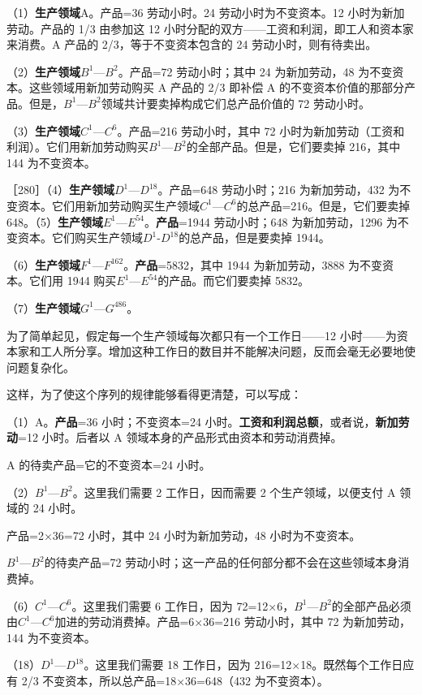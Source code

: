 （1）\textbf{生产领域}A。产品=36 劳动小时。24 劳动小时为不变资本。12 小时为新加劳动。产品的 1/3 由参加这 12 小时分配的双方——工资和利润，即工人和资本家来消费。A 产品的 2/3，等于不变资本包含的 24 劳动小时，则有待卖出。

（2）\textbf{生产领域}$B^{1}$—$B^{2}$。产品=72 劳动小时；其中 24 为新加劳动，48 为不变资本。这些领域用新加劳动购买 A 产品的 2/3 即补偿 A 的不变资本价值的那部分产品。但是，$B^{1}$—$B^{2}$领域共计要卖掉构成它们总产品价值的 72 劳动小时。

（3）\textbf{生产领域}$C^{1}$—$C^{6}$。产品=216 劳动小时，其中 72 小时为新加劳动（工资和利润）。它们用新加劳动购买$B^{1}$—$B^{2}$的全部产品。但是，它们要卖掉 216，其中 144 为不变资本。

［280］（4）\textbf{生产领域}$D^{1}$—$D^{18}$。产品=648 劳动小时；216 为新加劳动，432 为不变资本。它们用新加劳动购买生产领域$C^{1}$—$C^{6}$的总产品=216。但是，它们要卖掉 648。（5）\textbf{生产领域}$E^{1}$—$E^{54}$。\textbf{产品}=1944 劳动小时；648 为新加劳动，1296 为不变资本。它们购买生产领域$D^{1}$-$D^{18}$的总产品，但是要卖掉 1944。

（6）\textbf{生产领域}$F^{1}$—$F^{162}$。\textbf{产品}=5832，其中 1944 为新加劳动，3888 为不变资本。它们用 1944 购买$E^{1}$—$E^{54}$的产品。而它们要卖掉 5832。

（7）\textbf{生产领域}$G^{1}$—$G^{486}$。

为了简单起见，假定每一个生产领域每次都只有一个工作日——12 小时——为资本家和工人所分享。增加这种工作日的数目并不能解决问题，反而会毫无必要地使问题复杂化。

这样，为了使这个序列的规律能够看得更清楚，可以写成：

（1）A。\textbf{产品}=36 小时；不变资本=24 小时。\textbf{工资和利润总额}，或者说，\textbf{新加劳动}=12 小时。后者以 A 领域本身的产品形式由资本和劳动消费掉。

A 的待卖产品=它的不变资本=24 小时。

（2）$B^{1}$—$B^{2}$。这里我们需要 2 工作日，因而需要 2 个生产领域，以便支付 A 领域的 24 小时。

产品=2×36=72 小时，其中 24 小时为新加劳动，48 小时为不变资本。

$B^{1}$—$B^{2}$的待卖产品=72 劳动小时；这一产品的任何部分都不会在这些领域本身消费掉。

（6）$C^{1}$—$C^{6}$。这里我们需要 6 工作日，因为 72=12×6，$B^{1}$—$B^{2}$的全部产品必须由$C^{1}$—$C^{6}$加进的劳动消费掉。产品=6×36=216 劳动小时，其中 72 为新加劳动，144 为不变资本。

（18）$D^{1}$—$D^{18}$。这里我们需要 18 工作日，因为 216=12×18。既然每个工作日应有 2/3 不变资本，所以总产品=18×36=648（432 为不变资本）。

